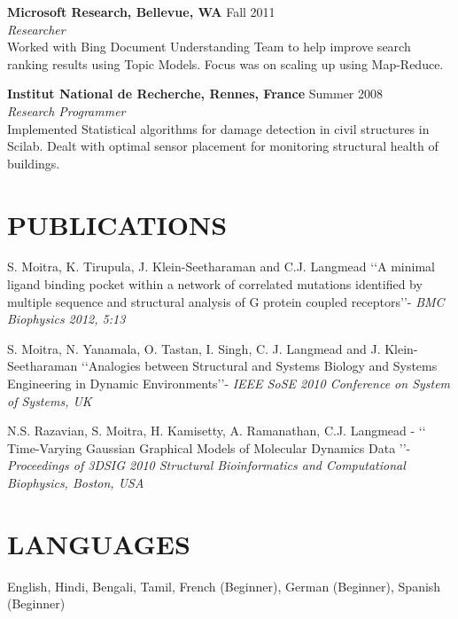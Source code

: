 \documentclass[margin]{res}
\begin{document}
\begin{resume}
              {\textbf{Microsoft Research, Bellevue, WA } } \hfill Fall 2011 \\
                {\sl Researcher } \\
		Worked with Bing Document Understanding Team to help improve search ranking results using Topic Models. Focus was on scaling up using Map-Reduce.
																								
                {\textbf{Institut National de Recherche, Rennes, France } } \hfill Summer 2008 \\
                {\sl Research Programmer } \\
                Implemented Statistical algorithms for damage detection in civil structures in Scilab. Dealt with optimal sensor placement for monitoring structural health of buildings.
                            
        				
\section{PUBLICATIONS}   S. Moitra, K. Tirupula, J. Klein-Seetharaman and C.J. Langmead \lq\lq{A minimal ligand binding pocket within a network of correlated mutations identified by multiple sequence and structural analysis of G protein coupled receptors}\rq\rq -  \textit{BMC Biophysics 2012, 5:13}	

S. Moitra, N. Yanamala, O. Tastan, I. Singh, C. J. Langmead and J. Klein-Seetharaman  \lq\lq{Analogies between Structural and Systems Biology and Systems Engineering in Dynamic Environments}\rq\rq -  \textit{IEEE SoSE 2010 Conference on System of Systems, UK}

 N.S. Razavian, S. Moitra, H. Kamisetty, A. Ramanathan, C.J. Langmead - \lq\lq{ Time-Varying Gaussian Graphical Models of Molecular Dynamics Data} \rq\rq - \textit{ Proceedings of 3DSIG 2010 Structural Bioinformatics and Computational Biophysics, Boston, USA}

\section{LANGUAGES} English, Hindi, Bengali, Tamil, French (Beginner), German (Beginner),
					 Spanish (Beginner)



                                    

\end{resume}
\end{document}
